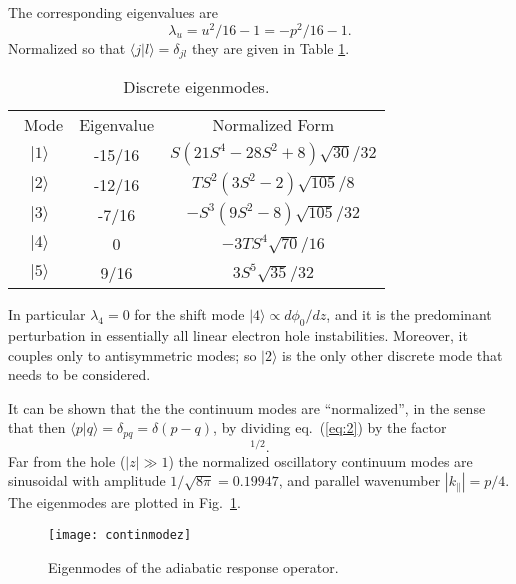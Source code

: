 \documentclass[12pt]{article}
\def\ket#1{|#1\rangle}
\def\bra#1{\langle#1}
\begin{document}
The corresponding eigenvalues are
\begin{equation}
  \label{eq:3}
  \lambda_u= u^2/16-1=-p^2/16-1.
\end{equation}
Normalized so that
$\bra{j}\ket{l}=\delta_{jl}$ they are given in Table \ref{discrete}. 
\begin{table}[ht]
  \center
\begin{tabular}{ccc}\
  Mode & Eigenvalue & Normalized Form\\
  $\ket{1}$& -15/16&$S(21S^4 - 28S^2 + 8)\sqrt{30}/32$\\
  $\ket{2}$& -12/16&$TS^2(3S^2 - 2)\sqrt{105}/8$\\
  $\ket{3}$& -7/16 &$-S^3(9S^2 - 8)\sqrt{105}/32 $\\
  $\ket{4}$&  0 &$-3TS^4\sqrt{70}/16 $\\
  $\ket{5}$&  9/16 &$3S^5\sqrt{35}/32 $\\
\end{tabular}
\caption{Discrete eigenmodes.\label{discrete}}
\end{table}
\noindent
In particular $\lambda_4=0$ for the shift mode
$\ket{4}\propto d\phi_0/dz$, and it is the predominant perturbation in
essentially all linear electron hole instabilities. Moreover, it
couples only to antisymmetric modes; so $\ket{2}$ is the only other
discrete mode that needs to be considered.

It can
be shown that the the continuum modes are ``normalized'', in the sense
that then $\bra{p}\ket{q}=\delta_{pq}=\delta(p-q)$, by dividing eq.\
(\ref{eq:2}) by the factor
\begin{equation}
  [8\pi(p^2+1^2)(p^2+2^2)(p^2+3^2)(p^2+4^2)(p^2+5^2)]^{1/2}.
  \label{eq:4}
\end{equation}
Far
from the hole ($|z|\gg1$) the normalized oscillatory continuum modes are
sinusoidal with amplitude $1/\sqrt{8\pi}=0.19947$, and parallel wavenumber
$|k_\parallel|=p/4$. The eigenmodes are plotted in Fig.\
\ref{modeplots}.
\begin{figure}\center
  \texttt{[image: continmodez]}
  \caption{Eigenmodes of the adiabatic response operator.\label{modeplots}}
\end{figure}
\end{document}
